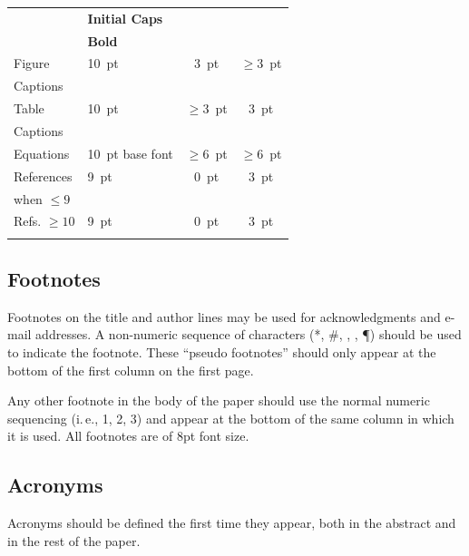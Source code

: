 \documentclass[letterpaper,
               nospread,     %
               ]{jacow}
\begin{document}
\begin{table}[h!b]
\begin{tabular}{llcc}
                            & \textbf{Initial Caps}       &                 &      \\
		& \textbf{Bold}               &                 &      \\[5pt]
		Figure        & \SI{10}{pt}                 & \SI{3}{pt}      & $\ge$\SI{3}{pt}  \\
		Captions      &                             &                 &      \\[5pt]
		Table         & \SI{10}{pt}                 & $\ge$\SI{3}{pt} & \SI{3}{pt}  \\
		Captions      &                             &                 &      \\[5pt]
		Equations     & \SI{10}{pt} base font       & $\ge$\SI{6}{pt}     & $\ge$\SI{6}{pt} \\[5pt]
		References      & \SI{9}{pt}				& \SI{0}{pt}      & \SI{3}{pt} \\
        when $\le9$ 	& \verb||	&                 &  \\[5pt]
        Refs. $\ge10$ 	& \SI{9}{pt}				& \SI{0}{pt}      & \SI{3}{pt}  \\
                		& \verb||	&    &    \\
		\bottomrule   %
	\end{tabular}
\end{table}

\subsection{Footnotes}

Footnotes on the title and author lines may be used for acknowledgments
and e-mail addresses. A non-numeric sequence of characters (*, \#,
\dag, \ddag, \P) should be used to indicate the footnote.
These “pseudo footnotes” should only
appear at the bottom of the first column on the first page.

Any other footnote in the body of the paper should
use the normal numeric sequencing (i.\,e., 1, 2, 3)
and appear at the bottom of the same column in which
it is used.  All footnotes are of 8pt font size.

\subsection{Acronyms}

Acronyms should be defined the first time they appear, 
both in the abstract and in the rest of the paper. 
\end{document}
